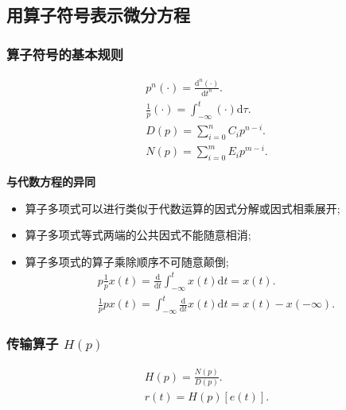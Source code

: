 \subsection{用算子符号表示微分方程} \label{2 用算子符号表示微分方程}

\subsubsection{算子符号的基本规则}
\rmg
\begin{gather}
    p^n(\cdot)=\frac{\mathrm{d}^n(\cdot)}{\mathrm{d}t^n}. \\
    \frac{1}{p}(\cdot)=\int_{-\infty}^{t}(\cdot)\mathrm{d}\tau. \\
    D(p)=\sum_{i=0}^{n}C_ip^{n-i}. \\
    N(p)=\sum_{i=0}^{m}E_ip^{m-i}.
\end{gather}

\textbf{与代数方程的异同}
\begin{itemize}
    \item 算子多项式可以进行类似于代数运算的因式分解或因式相乘展开;
    \item 算子多项式等式两端的公共因式不能随意相消;
    \item 算子多项式的算子乘除顺序不可随意颠倒;
          \begin{gather}
              p\frac{1}{p}x(t)=\frac{\mathrm{d}}{\mathrm{d}t}\int_{-\infty}^{t}x(t)\mathrm{d}t=x(t). \\
              \frac{1}{p}px(t)=\int_{-\infty}^{t}\frac{\mathrm{d}}{\mathrm{d}t}x(t)\mathrm{d}t=x(t)-x(-\infty).
          \end{gather}
\end{itemize}

\subsubsection{传输算子 \texorpdfstring{$H(p)$}{H(p)}}
\rmg
\begin{gather}
    H(p)=\frac{N(p)}{D(p)}. \\
    r(t)=H(p)[e(t)].
\end{gather}
